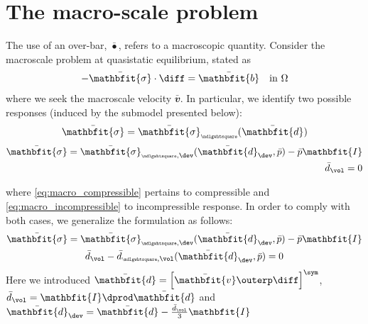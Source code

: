 \documentclass[a4paper,11pt]{article}
\renewcommand{\ta}[1]{\mathbfit{#1}}
\renewcommand{\ts}[1]{\mathbfit{#1}}
\renewcommand{\Box}{{\scalebox{0.5}{\mdlgwhtsquare}}}
\begin{document}
\section{The macro-scale problem} \label{sec:macro}
The use of an over-bar, $\bar{\bullet}$, refers to a macroscopic quantity.
Consider the macroscale problem at quasistatic equilibrium, stated as
\begin{align}
 -\bar{\ts\sigma}\cdot \diff = \bar{\ts b} \quad \text{in } \Omega
\end{align}
where we seek the macroscale velocity $\bar{\ts v}$. In particular, we identify two possible responses (induced by the submodel presented below):
\begin{gather}
 \bar{\ts\sigma} = \bar{\ts\sigma}_\Box(\bar{\ts d}) \label{eq:macro_compressible}
\end{gather}
\vspace{-2\baselineskip} %
\begin{subequations} \label{eq:macro_incompressible}
\begin{align}
  \bar{\ts\sigma} = \bar{\ts\sigma}_{\Box,\dev}(\bar{\ts d}_\dev, \bar p) - \bar p \ts I\\
  \bar{d}_\vol = 0
\end{align}
\end{subequations}


where \eqref{eq:macro_compressible} pertains to compressible and \eqref{eq:macro_incompressible} to incompressible response.
In order to comply with both cases, we generalize the formulation as follows:
\begin{subequations} \label{eq:macro_mixed}
\begin{gather}
 \bar{\ts\sigma} = \bar{\ts\sigma}_{\Box,\dev}(\bar{\ts d}_\dev,\bar p) - \bar p\ts I\\
 \bar{d}_\vol - \bar{d}_{\Box,\vol}(\bar{\ts d}_\dev, \bar p) = 0
\end{gather}
\end{subequations}
Here we introduced $\bar{\ts d} = \left[ \bar{\ta v} \outerp \diff \right]^\sym$, $\bar{d}_\vol = \ts I \dprod \bar{\ts d}$ and $\bar{\ts d}_\dev = \bar{\ts d} - \frac{\bar d_\vol}{3}\ts I$ 
\end{document}
